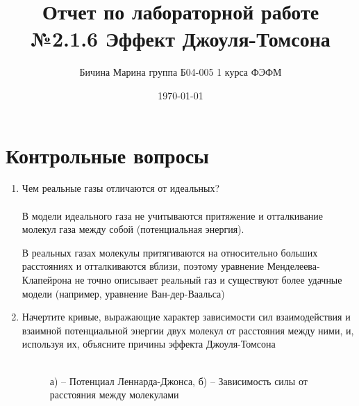 \documentclass[a4paper,12pt]{article} %
\author{Бичина Марина 
группа Б04-005 1 курса ФЭФМ}
\title{Отчет по лабораторной работе №2.1.6
Эффект Джоуля-Томсона}
\date{\today}
\begin{document}


\section{Контрольные вопросы}
\begin{enumerate} 
\item Чем реальные газы отличаются от идеальных? \\ \\
В модели идеального газа не учитываются притяжение и отталкивание молекул газа между собой (потенциальная энергия). 

В реальных газах молекулы притягиваются на относительно больших расстояниях и отталкиваются вблизи, поэтому уравнение Менделеева-Клапейрона не точно описывает реальный газ и существуют более удачные модели (например, уравнение Ван-дер-Ваальса)

\item Начертите кривые, выражающие характер зависимости сил взаимодействия и взаимной потенциальной энергии двух молекул от расстояния между ними, и, используя их, объясните причины эффекта Джоуля-Томсона\\ \\
\begin{figure}[h]
\begin{minipage}[h]{0.49\linewidth}
\end{minipage}
\hfill
\begin{minipage}[h]{0.49\linewidth}
\end{minipage}
\caption{а) -- Потенциал Леннарда-Джонса, б) -- Зависимость силы от расстояния между молекулами}
\label{ris:image1}
\end{figure}


\end{enumerate}
\end{document}
